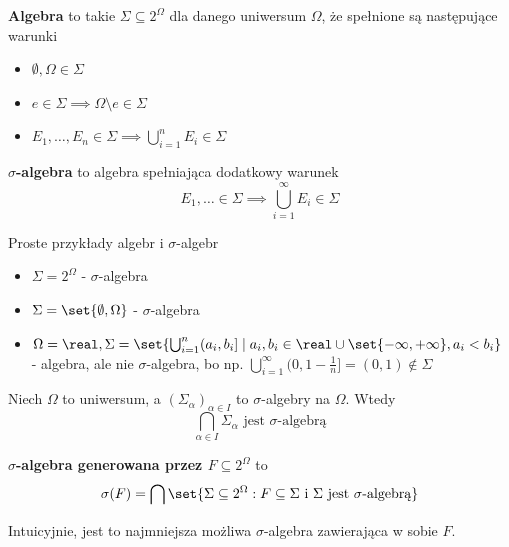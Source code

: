 \begin{definition}
	\textbf{Algebra} to takie \(\Sigma \subseteq 2^{\Omega}\) dla danego uniwersum \(\Omega\), że spełnione są następujące warunki
	\begin{itemize}
		\item \(\emptyset, \Omega \in \Sigma\)
		\item \(e \in \Sigma \implies \Omega \setminus e \in \Sigma\)
		\item \(E_1, \dots, E_n \in \Sigma \implies \bigcup_{i=1}^n E_i \in \Sigma\)
	\end{itemize}
\end{definition}

\begin{definition}
	\label{sigma-algebra-definition}
	\textbf{\(\sigma\)-algebra} to algebra spełniająca dodatkowy warunek
	\[
		E_1, \dots \in \Sigma \implies \bigcup_{i=1}^{\infty} E_i \in \Sigma
	\]
\end{definition}

\begin{example}
	Proste przykłady algebr i \(\sigma\)-algebr
	\begin{itemize}
		\item \(\Sigma = 2^{\Omega}\) - \(\sigma\)-algebra
		\item \(\Sigma = \set{\emptyset, \Omega}\) - \(\sigma\)-algebra
		\item \(\Omega = \real, \Sigma = \set{\bigcup_{i=1}^n (a_i, b_i] \mid a_i, b_i \in \real \cup \set{-\infty, +\infty}, a_i < b_i}\) - algebra, ale nie \(\sigma\)-algebra, bo np. \(\bigcup_{i=1}^\infty (0, 1 - \frac{1}{n}] = (0, 1) \notin \Sigma\)
	\end{itemize}
\end{example}

\begin{lemma}
	Niech \(\Omega\) to uniwersum, a \((\Sigma_\alpha)_{\alpha \in I}\) to \(\sigma\)-algebry na \(\Omega\). Wtedy
	\[
		\bigcap_{\alpha \in I} \Sigma_\alpha \text{ jest \(\sigma\)-algebrą}
	\]
\end{lemma}

\begin{definition}
	\textbf{\(\sigma\)-algebra generowana przez \(F \subseteq 2^\Omega\)} to
	\[
		\sigma(F) = \bigcap \set{\Sigma \subseteq 2^\Omega : F \subseteq \Sigma \text{ i } \Sigma \text{ jest } \sigma \text{-algebrą}}
	\]

	Intuicyjnie, jest to najmniejsza możliwa \(\sigma\)-algebra zawierająca w sobie \(F\).
\end{definition}


